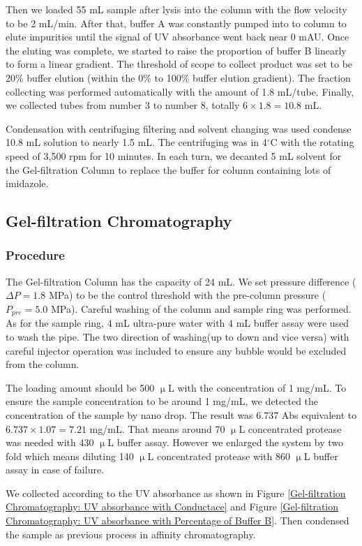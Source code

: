 \documentclass{report}
\begin{document}
Then we loaded 55 mL sample after lysis into the column with the flow velocity to be 2 mL/min.
After that, buffer A was constantly pumped into to column to elute impurities until the signal of UV absorbance went back near 0 mAU.
Once the eluting was complete, we started to raise the proportion of buffer B linearly to form a linear gradient.
The threshold of scope to collect product was set to be 20\% buffer elution (within the 0\% to 100\% buffer elution gradient).
The fraction collecting was performed automatically with the amount of 1.8 mL/tube.
Finally, we collected tubes from number 3 to number 8, totally $6\times1.8=10.8$ mL.

Condensation with centrifuging filtering and solvent changing was used condense 10.8 mL solution to nearly 1.5 mL.
The centrifuging was in 4$^\circ$C with the rotating speed of 3,500 rpm for 10 minutes.
In each turn, we decanted 5 mL solvent for the Gel-filtration Column to replace the buffer for  column containing lots of imidazole.
\subsection{Gel-filtration Chromatography}
\subsubsection{Procedure}
The Gel-filtration Column has the capacity of 24 mL.
We set pressure difference ($\Delta P=1.8$ MPa) to be the control threshold with the pre-column pressure ($P_{pre}=5.0$ MPa).
Careful washing of the column and sample ring was performed.
As for the sample ring, 4 mL ultra-pure water with 4 mL buffer assay were used to wash the pipe.
The two direction of washing(up to down and vice versa) with careful injector operation was included to ensure any bubble would be excluded from the column.

The loading amount should be 500 $\upmu$L with the concentration of 1 mg/mL.
To ensure the sample concentration to be around 1 mg/mL, we detected the concentration of the sample by nano drop.
The result was 6.737 Abs equivalent to $6.737\times1.07=7.21$ mg/mL.
That means around 70 $\upmu$L concentrated protease was needed with 430 $\upmu$L buffer assay.
However we enlarged the system by two fold which means diluting 140 $\upmu$L concentrated protease with 860 $\upmu$L buffer assay in case of failure.



We collected according to the UV absorbance as shown in Figure \ref{Gel-filtration Chromatography: UV absorbance with Conductace} and Figure \ref{Gel-filtration Chromatography: UV absorbance with Percentage of Buffer B}.
Then condensed the sample as previous process in affinity chromatography.
\end{document}
